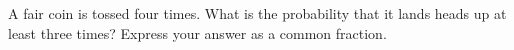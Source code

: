 A fair coin is tossed four times. What is the probability that it lands heads up at least three times? Express your answer as a common fraction.
